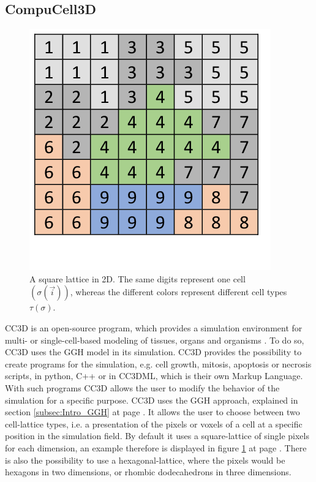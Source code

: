 \subsection{CompuCell3D}
\begin{figure}
	\center
	\includegraphics[scale=0.4]{figures/2DSquareLattice.png}
	\caption{A square lattice in 2D. The same digits represent one cell $(\sigma(\vec{i}))$, whereas the different colors represent different cell types $\tau(\sigma)$.}
	\label{img:2DSquareLattice}
\end{figure}
\ac{CC3D} is an open-source program, which provides a simulation environment for multi- or single-cell-based modeling of tissues, organs and organisms \cite{CC3D.org}. To do so, \ac{CC3D} uses the \ac{GGH} model in its simulation. 
CC3D provides the possibility to create programs for the simulation, e.g. cell growth, mitosis, apoptosis or necrosis scripts, in python, C++ or in CC3DML, which is their own Markup Language. With such programs CC3D allows the user to modify the behavior of the simulation for a specific purpose.
CC3D uses the \ac{GGH} approach, explained in section \ref{subsec:Intro_GGH} at page \pageref{subsec:Intro_GGH}. It allows the user to choose between two cell-lattice types, i.e. a presentation of the pixels or voxels of a cell at a specific position in the simulation field. By default it uses a square-lattice of single pixels for each dimension, an example therefore is displayed in figure \ref{img:2DSquareLattice} at page \pageref{img:2DSquareLattice}. There is also the possibility to use a hexagonal-lattice, where the pixels would be hexagons in two dimensions, or rhombic dodecahedrons in three dimensions.
